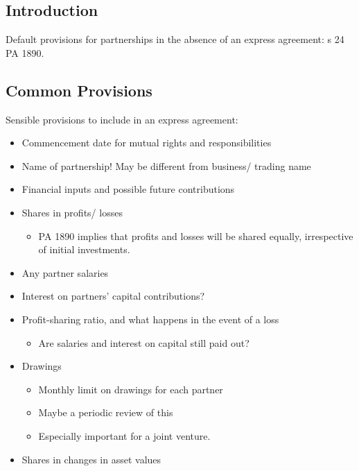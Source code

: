 \documentclass[
]{article}
\providecommand{\tightlist}{%
  \setlength{\itemsep}{0pt}\setlength{\parskip}{0pt}}
\begin{document}
\hypertarget{introduction-1}{%
\subsection{Introduction}\label{introduction-1}}

Default provisions for partnerships in the absence of an express
agreement: s 24 PA 1890.

\hypertarget{common-provisions}{%
\subsection{Common Provisions}\label{common-provisions}}

Sensible provisions to include in an express agreement:

\begin{itemize}
\tightlist
\item
  Commencement date for mutual rights and responsibilities
\item
  Name of partnership! May be different from business/ trading name
\item
  Financial inputs and possible future contributions
\item
  Shares in profits/ losses

  \begin{itemize}
  \tightlist
  \item
    PA 1890 implies that profits and losses will be shared equally,
    irrespective of initial investments.
  \end{itemize}
\item
  Any partner salaries
\item
  Interest on partners' capital contributions?
\item
  Profit-sharing ratio, and what happens in the event of a loss

  \begin{itemize}
  \tightlist
  \item
    Are salaries and interest on capital still paid out?
  \end{itemize}
\item
  Drawings

  \begin{itemize}
  \tightlist
  \item
    Monthly limit on drawings for each partner
  \item
    Maybe a periodic review of this
  \item
    Especially important for a joint venture.
  \end{itemize}
\item
  Shares in changes in asset values


\end{itemize}
\end{document}

